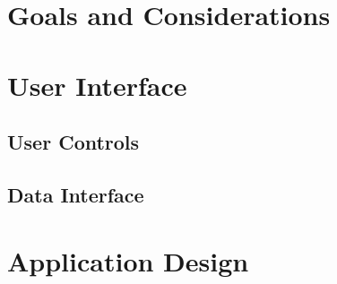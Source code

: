 \section{Goals and Considerations}
\section{User Interface}
\subsection{User Controls}
\subsection{Data Interface}
\section{Application Design}
